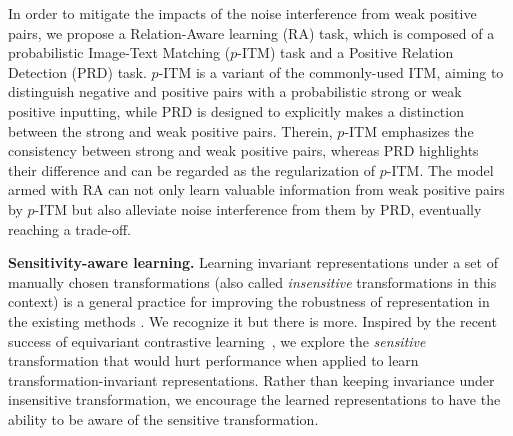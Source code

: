 \documentclass{article}
\begin{document}
In order to mitigate the impacts of the noise interference from weak positive pairs, we propose a Relation-Aware learning (RA) task, which is composed of a probabilistic Image-Text Matching ($p$-ITM) task and a Positive Relation Detection (PRD) task.
$p$-ITM is a variant of the commonly-used ITM, aiming to distinguish negative and positive pairs with a probabilistic strong or weak positive inputting, while PRD is designed to explicitly makes a distinction between the strong and weak positive pairs.
Therein, $p$-ITM emphasizes the consistency between strong and weak positive pairs, whereas PRD highlights their difference and can be regarded as the regularization of $p$-ITM. 
The model armed with RA can not only learn valuable information from weak positive pairs by $p$-ITM but also alleviate noise interference from them by PRD, eventually reaching a trade-off.



\textbf{Sensitivity-aware learning.}
Learning invariant representations under a set of manually chosen transformations (also called \emph{insensitive} transformations in this context) is a general practice for improving the robustness of representation in the existing methods \cite{caron2020unsupervised,chen2021exploring}.
We recognize it but there is more.
Inspired by the recent success of equivariant contrastive learning~\cite{dangovski2022equivariant}, we explore the \emph{sensitive} transformation that would hurt performance when applied to learn transformation-invariant representations.
Rather than keeping invariance under insensitive transformation, we encourage the learned representations to have the ability to be aware of the sensitive transformation.
\end{document}
